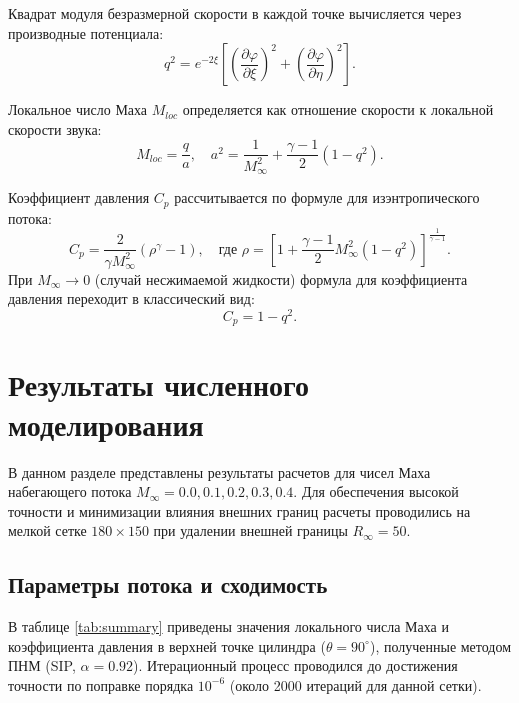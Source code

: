 \documentclass[a4paper,12pt]{article}
\begin{document}
	Квадрат модуля безразмерной скорости в каждой точке вычисляется через производные потенциала:
	\begin{equation}
		q^2 = e^{-2\xi} \left[ \left( \frac{\partial \varphi}{\partial \xi} \right)^2 + \left( \frac{\partial \varphi}{\partial \eta} \right)^2 \right].
	\end{equation}
	
	Локальное число Маха $M_{loc}$ определяется как отношение скорости к локальной скорости звука:
	\begin{equation}
		M_{loc} = \frac{q}{a}, \quad a^2 = \frac{1}{M_\infty^2} + \frac{\gamma-1}{2} (1 - q^2).
	\end{equation}
	
	Коэффициент давления $C_p$ рассчитывается по формуле для изэнтропического потока:
	\begin{equation}
		C_p = \frac{2}{\gamma M_\infty^2} \left( \rho^\gamma - 1 \right), \quad \text{где } \rho = \left[ 1 + \frac{\gamma-1}{2} M_\infty^2 (1 - q^2) \right]^{\frac{1}{\gamma-1}}.
	\end{equation}
	При $M_\infty \to 0$ (случай несжимаемой жидкости) формула для коэффициента давления переходит в классический вид:
	\begin{equation}
		C_p = 1 - q^2.
	\end{equation}

	\section{Результаты численного моделирования}

	В данном разделе представлены результаты расчетов для чисел Маха набегающего потока $M_\infty = 0.0, 0.1, 0.2, 0.3, 0.4$. Для обеспечения высокой точности и минимизации влияния внешних границ расчеты проводились на мелкой сетке $180 \times 150$ при удалении внешней границы $R_\infty = 50$.

	\subsection{Параметры потока и сходимость}

	В таблице \ref{tab:summary} приведены значения локального числа Маха и коэффициента давления в верхней точке цилиндра ($\theta = 90^\circ$), полученные методом ПНМ (SIP, $\alpha = 0.92$). Итерационный процесс проводился до достижения точности по поправке порядка $10^{-6}$ (около 2000 итераций для данной сетки).
\end{document}
